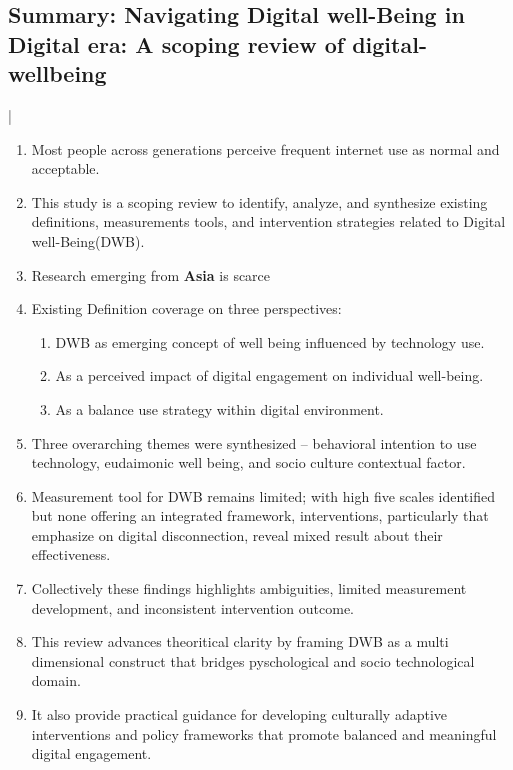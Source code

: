 \documentclass[12pt]{article}
\begin{document}
\subsection{Summary: Navigating Digital well-Being in Digital era: A scoping review of digital-wellbeing \cite{Zhao2024DigitalWellbeing}}|
\begin{enumerate}
    \item Most people across generations perceive frequent internet use as normal and acceptable.
    \item This study is a scoping review to identify, analyze, and synthesize existing definitions, measurements tools, and intervention strategies related to Digital well-Being(DWB).
    \item  Research emerging from \textbf{Asia} is scarce
        \item Existing Definition coverage on three perspectives:
        \begin{enumerate}
            \item DWB as emerging concept of well being influenced by technology use.
            \item As a perceived impact of digital engagement on individual well-being.
            \item As a balance use strategy within digital environment.
        \end{enumerate}
        \item Three overarching themes were synthesized -- behavioral intention to use technology, eudaimonic well being, and socio culture contextual factor.
        \item Measurement tool for DWB remains limited; with high five scales identified but none offering an integrated framework, interventions, particularly that emphasize on digital disconnection, reveal mixed result about their effectiveness.
        \item Collectively these findings highlights ambiguities, limited measurement development, and inconsistent intervention outcome.
        \item This review advances theoritical clarity by framing DWB as a multi dimensional construct that bridges pyschological and socio technological domain.
        \item It also provide practical guidance for developing culturally adaptive interventions and policy frameworks that promote balanced and meaningful digital engagement.
    \end{enumerate}
\end{document}
